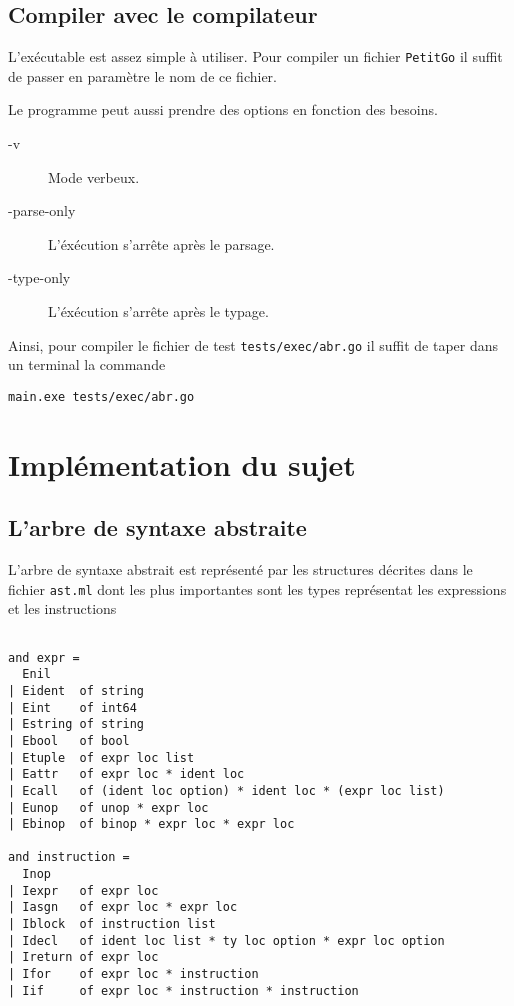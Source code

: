 \documentclass{article}
\begin{document}
\subsection{Compiler avec le compilateur\label{sec:exec}}

L'exécutable est assez simple à utiliser. Pour compiler un fichier \texttt{PetitGo} il suffit de passer en paramètre le nom de ce fichier.

Le programme peut aussi prendre des options en fonction des besoins.

\begin{description}
\item[-v] Mode verbeux.
\item[-\-parse-only] L'éxécution s'arrête après le parsage.
\item[-\-type-only] L'éxécution s'arrête après le typage.
\end{description}

Ainsi, pour compiler le fichier de test \texttt{tests/exec/abr.go} il suffit de taper dans un terminal la commande

\begin{verbatim}
main.exe tests/exec/abr.go
\end{verbatim}

\section{Implémentation du sujet}

\subsection{L'arbre de syntaxe abstraite}

L'arbre de syntaxe abstrait est représenté par les structures décrites dans le fichier \texttt{ast.ml} dont les plus importantes sont les types représentat les expressions et les instructions

\begin{verbatim}

and expr =
  Enil
| Eident  of string
| Eint    of int64
| Estring of string
| Ebool   of bool
| Etuple  of expr loc list
| Eattr   of expr loc * ident loc
| Ecall   of (ident loc option) * ident loc * (expr loc list)
| Eunop   of unop * expr loc
| Ebinop  of binop * expr loc * expr loc

and instruction =
  Inop
| Iexpr   of expr loc
| Iasgn   of expr loc * expr loc
| Iblock  of instruction list
| Idecl   of ident loc list * ty loc option * expr loc option
| Ireturn of expr loc
| Ifor    of expr loc * instruction
| Iif     of expr loc * instruction * instruction

\end{verbatim}
\end{document}
